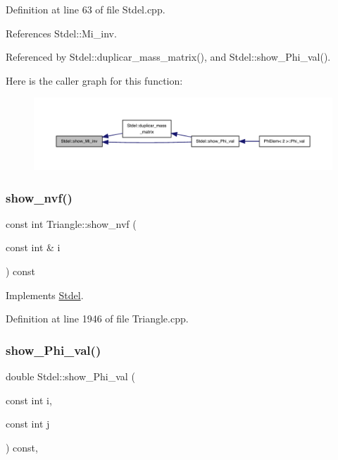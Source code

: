 Definition at line 63 of file Stdel.\+cpp.



References Stdel\+::\+Mi\+\_\+inv.



Referenced by Stdel\+::duplicar\+\_\+mass\+\_\+matrix(), and Stdel\+::show\+\_\+\+Phi\+\_\+val().

Here is the caller graph for this function\+:
\nopagebreak
\begin{figure}[H]
\begin{center}
\leavevmode
\includegraphics[width=350pt]{classStdel_a11bf2897170ada9a9dd8f641a39585e5_icgraph}
\end{center}
\end{figure}
\mbox{\label{classTriangle_ad028de34010b57e995d0206f9257b37b}} 
\subsubsection{\texorpdfstring{show\+\_\+nvf()}{show\_nvf()}}
{\footnotesize\ttfamily const int Triangle\+::show\+\_\+nvf (\begin{DoxyParamCaption}\item[{const int \&}]{i }\end{DoxyParamCaption}) const\hspace{0.3cm}{\ttfamily [virtual]}}



Implements \hyperlink{classStdel_a2a504322269a749dd3c443d0e86c4a6c}{Stdel}.



Definition at line 1946 of file Triangle.\+cpp.

\mbox{\label{classStdel_a6565c36150823a1f52a2daf05806f7a4}} 
\subsubsection{\texorpdfstring{show\+\_\+\+Phi\+\_\+val()}{show\_Phi\_val()}}
{\footnotesize\ttfamily double Stdel\+::show\+\_\+\+Phi\+\_\+val (\begin{DoxyParamCaption}\item[{const int}]{i,  }\item[{const int}]{j }\end{DoxyParamCaption}) const\hspace{0.3cm}{\ttfamily [inline]}, {\ttfamily [inherited]}}



